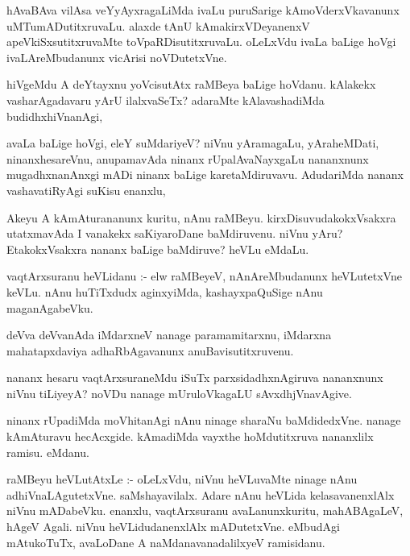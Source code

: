\documentclass{article}
\begin{document}
\begin{mn}
hAvaBAva vilAsa veYyAyxragaLiMda ivaLu puruSarige kAmoVderxVkavanunx 
uMTumADutitxruvaLu. alaxde tAnU kAmakirxVDeyanenxV apeVkiSxsutitxruvaMte 
toVpaRDisutitxruvaLu. oLeLxVdu ivaLa baLige hoVgi ivaLAreMbudanunx vicArisi noVDutetxVne.
\end{mn}

\begin{mn}
hiVgeMdu A deYtayxnu yoVcisutAtx raMBeya baLige hoVdanu. kAlakekx vasharAgadavaru  
yArU  ilalxvaSeTx?  adaraMte  kAlavashadiMda budidhxhiVnanAgi, 
\end{mn}

\begin{mn}
avaLa baLige hoVgi, eleY suMdariyeV? niVnu yAramagaLu, yAraheMDati, ninanxhesareVnu, 
anupamavAda ninanx rUpalAvaNayxgaLu nananxnunx mugadhxnanAnxgi mADi ninanx baLige 
karetaMdiruvavu. AdudariMda nananx vashavatiRyAgi suKisu enanxlu, 
\end{mn}

\begin{mn}
Akeyu A kAmAturananunx kuritu, nAnu raMBeyu. kirxDisuvudakokxVsakxra utatxmavAda 
I vanakekx saKiyaroDane baMdiruvenu. niVnu yAru? EtakokxVsakxra nananx 
baLige baMdiruve? heVLu eMdaLu.
\end{mn}

\begin{mn}
vaqtArxsuranu heVLidanu :- elw  raMBeyeV, nAnAreMbudanunx heVLutetxVne 
keVLu. nAnu huTiTxdudx aginxyiMda, kashayxpaQuSige nAnu maganAgabeVku.
\end{mn}

\begin{mn}
deVva deVvanAda iMdarxneV nanage paramamitarxnu, iMdarxna mahatapxdaviya  
adhaRbAgavanunx  anuBavisutitxruvenu.
\end{mn}

\begin{mn}
nananx hesaru vaqtArxsuraneMdu iSuTx parxsidadhxnAgiruva nananxnunx niVnu 
tiLiyeyA? noVDu nanage mUruloVkagaLU sAvxdhjVnavAgive.
\end{mn}

\begin{mn}
ninanx rUpadiMda moVhitanAgi nAnu ninage sharaNu baMdidedxVne.  nanage 
kAmAturavu hecAcxgide.  kAmadiMda vayxthe hoMdutitxruva  nananxlilx ramisu. eMdanu.
\end{mn}

\begin{mn}
raMBeyu heVLutAtxLe :- oLeLxVdu, niVnu heVLuvaMte ninage nAnu adhiVnaLAgutetxVne. 
saMshayavilalx.  Adare nAnu heVLida kelasavanenxlAlx  niVnu  mADabeVku.  enanxlu,  
vaqtArxsuranu avaLanunxkuritu,  mahABAgaLeV, hAgeV Agali.  niVnu heVLidudanenxlAlx  
mADutetxVne. eMbudAgi mAtukoTuTx,  avaLoDane A naMdanavanadalilxyeV ramisidanu.
\end{mn}
\end{document}
